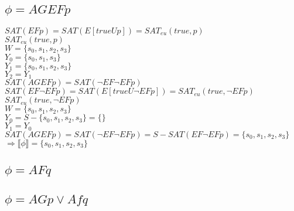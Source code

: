 \documentclass[a4paper,10pt]{article}
\begin{document}
\subsection*{$\phi = AGEFp$}
\hspace*{5mm} $SAT(EFp)=SAT(E[trueUp])=SAT_{eu}(true,p)$ 
\\[0.25cm] 
\hspace*{5mm}$SAT_{eu}(true,p)$ 
\\[0.25cm] 
\hspace*{10mm} $W = \{s_0,s_1,s_2,s_3\}$ 
\\[0.25cm] 
\hspace*{10mm} $Y_0 = \{s_0,s_1,s_3\}$ 
\\[0.25cm] 
\hspace*{10mm} $Y_1 = \{s_0,s_1,s_2,s_3\}$ 
\\[0.25cm] 
\hspace*{10mm} $Y_2 = Y_1$ 
\\[0.25cm] 
\hspace*{5mm} $SAT(AGEFp)=SAT(\neg EF \neg EF p)$ 
\\[0.25cm] 
\hspace*{5mm} $SAT(EF \neg EF p) =  SAT(E[trueU\neg EF p]) = SAT_{eu}(true,\neg EF p)$ 
\\[0.25cm] 
\hspace*{5mm} $SAT_{eu}(true,\neg EF p)$ 
\\[0.25cm] 
\hspace*{10mm} $W = \{s_0,s_1,s_2,s_3\}$ 
\\[0.25cm] 
\hspace*{10mm} $Y_0 = S - \{s_0,s_1,s_2,s_3\} = \{ \}$ 
\\[0.25cm] 
\hspace*{10mm} $Y_1 = Y_0$ 
\\[0.25cm] 
\hspace*{5mm} $SAT(AGEFp)=SAT(\neg EF \neg EF p) = S - SAT(EF \neg EF p) = \{s_0,s_1,s_2,s_3\}$ 
\\[0.25cm] 
\hspace*{5mm} $\Rightarrow \llbracket \phi \rrbracket = \{s_0,s_1,s_2,s_3\}$





\subsection*{$\phi = AFq$}
\subsection*{$\phi = AGp \vee Afq$}
\end{document}
